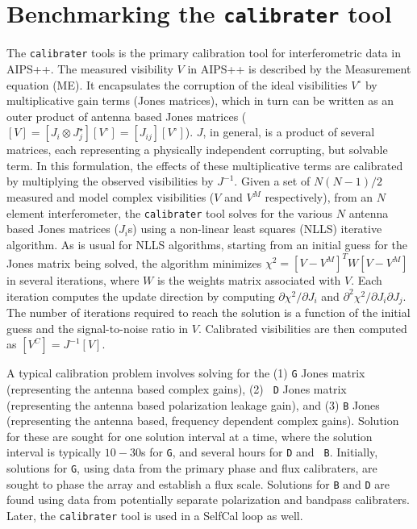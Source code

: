 \section{Benchmarking the {\tt calibrater} tool}

The {\tt calibrater} tools is the primary calibration tool for
interferometric data in AIPS++.  The measured visibility $V$ in AIPS++
is described by the Measurement equation (ME).  It encapsulates the
corruption of the ideal visibilities $V^\circ$ by multiplicative gain
terms (Jones matrices), which in turn can be written as an outer
product of antenna based Jones matrices ($[V]=[J_i \otimes J_j^\star]
[V^\circ]=[J_{ij}][V^\circ]$).  $J$, in general, is a product of
several matrices, each representing a physically independent
corrupting, but solvable term.  In this formulation, the effects of
these multiplicative terms are calibrated by multiplying the observed
visibilities by $J^{-1}$.  Given a set of $N(N-1)/2$ measured and
model complex visibilities ($V$ and $V^M$ respectively), from an $N$
element interferometer, the {\tt calibrater} tool solves for the
various $N$ antenna based Jones matrices ($J_i$s) using a non-linear
least squares (NLLS) iterative algorithm.  As is usual for NLLS
algorithms, starting from an initial guess for the Jones matrix being
solved, the algorithm minimizes $\chi^2 = [V - V^M]^TW[V-V^M]$ in
several iterations, where $W$ is the weights matrix associated with
$V$.  Each iteration computes the update direction by computing
$\partial\chi^2/\partial J_i$ and $\partial^2
\chi^2/\partial J_i\partial J_j$.  The number of iterations required
to reach the solution is a function of the initial guess and the
signal-to-noise ratio in $V$.  Calibrated visibilities are then
computed as $[V^C]=J^{-1} [V]$.

A typical calibration problem involves solving for the (1) {\tt G}
Jones matrix (representing the antenna based complex gains), (2) {\tt
D} Jones matrix (representing the antenna based polarization leakage
gain), and (3) {\tt B} Jones (representing the antenna based,
frequency dependent complex gains).  Solution for these are sought for
one solution interval at a time, where the solution interval is
typically $10-30$s for {\tt G}, and several hours for {\tt D} and {\tt
B}.  Initially, solutions for {\tt G}, using data from the primary
phase and flux calibraters, are sought to phase the array and
establish a flux scale.  Solutions for {\tt B} and {\tt D} are found
using data from potentially separate polarization and bandpass
calibraters.  Later, the {\tt calibrater} tool is used in a
SelfCal loop as well.

